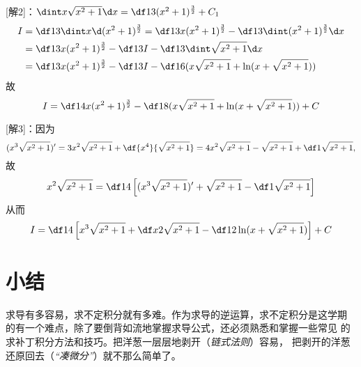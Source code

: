 [解2]：$\dint x\sqrt{x^2+1}\d x=\df13(x^2+1)^{\frac32}+C_1$
\begin{align}
I&=\df13\dint x\d(x^2+1)^{\frac32}=\df13 x(x^2+1)^{\frac32}
-\df13\dint(x^2+1)^{\frac32}\d x\notag\\
&=\df13x(x^2+1)^{\frac32}-\df13I-\df13\dint\sqrt{x^2+1}\d x\notag\\
&=\df13x(x^2+1)^{\frac32}-\df13I-\df16(x\sqrt{x^2+1}
+\ln(x+\sqrt{x^2+1}))\notag
\end{align}
故
$$I=\df14x(x^2+1)^{\frac32}-\df18(x\sqrt{x^2+1}
+\ln(x+\sqrt{x^2+1}))+C$$

[解3]：因为
$$(x^3\sqrt{x^2+1})'=3x^2\sqrt{x^2+1}+\df{x^4}{\sqrt{x^2+1}}
=4x^2\sqrt{x^2+1}-\sqrt{x^2+1}+\df1{\sqrt{x^2+1}},$$
故
$$x^2\sqrt{x^2+1}=\df14\left[(x^3\sqrt{x^2+1})'+\sqrt{x^2+1}
-\df1{\sqrt{x^2+1}}\right]$$
从而
$$I=\df14\left[x^3\sqrt{x^2+1}+\df x2\sqrt{x^2+1}
-\df12\ln(x+\sqrt{x^2+1})\right]+C$$

% 

\section{小结}

求导有多容易，求不定积分就有多难。作为求导的逆运算，求不定积分是这学期
的有一个难点，除了要倒背如流地掌握求导公式，还必须熟悉和掌握一些常见
的求补丁积分方法和技巧。把洋葱一层层地剥开（{\it 链式法则}）容易，
把剥开的洋葱还原回去（{\it “凑微分”}）就不那么简单了。


